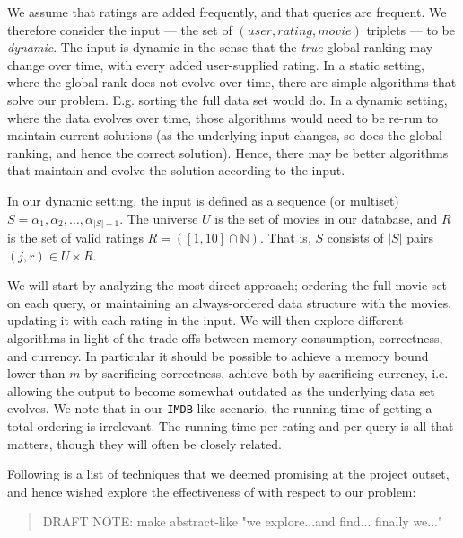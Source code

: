 \documentclass[a4paper, titlepage]{article}
\renewcommand{\%}{\scalebox{.9}{\oldpct}}
\begin{document}
We assume that ratings are added frequently, and that queries are frequent. We
therefore consider the input --- the set of $(user, rating, movie)$ triplets ---
to be \textit{dynamic}. The input is dynamic in the sense that the \textit{true}
global ranking may change over time, with every added user-supplied rating. In a
static setting, where the global rank does not evolve over time, there are
simple algorithms that solve our problem. E.g. sorting the full data set would
do.
In a dynamic setting, where the data evolves over time,
those algorithms would need to be re-run to maintain current solutions (as the
underlying input changes, so does the global ranking, and hence the correct
solution). Hence, there may be better algorithms that maintain and evolve the
solution according to the input.

In our dynamic setting, the input is defined as a sequence (or multiset) $S =
\alpha_1, \alpha_2,\ldots,\alpha_{|S|+1}$. The universe $U$ is the set of movies
in our database, and $R$ is the set of valid ratings $R =
\left(\left[1,10\right]\cap \mathbb{N}\right)$. That is, $S$ consists of $|S|$
pairs $(j,r)\in U \times R$.

We will start by analyzing the most direct approach; ordering the full movie set
on each query, or maintaining an always-ordered data structure with the movies,
updating it with each rating in the input. We will then explore different
algorithms in light of the trade-offs between memory consumption, correctness,
and currency. In particular it should be possible to achieve a memory bound
lower than $m$ by sacrificing correctness, achieve both by sacrificing currency,
i.e. allowing the output to become somewhat outdated as the underlying data set
evolves. We note that in our \texttt{IMDB} like scenario, the running time of
getting a total ordering is irrelevant. The running time per rating and per
query is all that matters, though they will often be closely related.

Following is a list of techniques that we deemed promising at the project
outset, and hence wished explore the effectiveness of with respect to our
problem:

\begin{quote}
	DRAFT NOTE: make abstract-like "we explore...and find... finally we..."
\end{quote}
\end{document}

